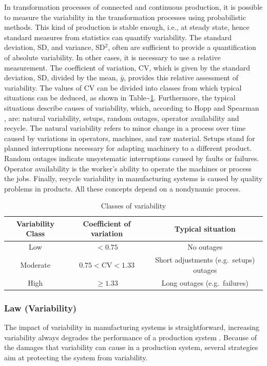 \documentclass{article}
\begin{document}
In transformation processes of connected and continuous production, it is possible to measure the variability in the transformation processes using probabilistic methods.
This kind of production is stable enough, i.e., at steady state, hence standard measures from statistics can quantify variability.
The standard deviation, SD, and variance, SD\(^2\), often are sufficient to provide a quantification of absolute variability.
In other cases, it is necessary to use a relative measurement.
The coefficient of variation, CV, which is given by the standard deviation, SD, divided by the mean, \(\bar{y}\), provides this relative assessment of variability.
The values of CV can be divided into classes from which typical situations can be deduced, as shown in Table\textasciitilde{}\ref{tb:Classes of variability}.
Furthermore, the typical situations describe causes of variability, which, according to Hopp and Spearman \cite{Hopp2001}, are: natural variability, setups, random outages, operator availability and recycle.
The natural variability refers to minor change in a process over time caused by variations in operators, machines, and raw material.
Setups stand for planned interruptions necessary for adapting machinery to a different product.
Random outages indicate unsystematic interruptions caused by faults or failures.
Operator availability is the worker's ability to operate the machines or process the jobs.
Finally, recycle variability in manufacturing systems is caused by quality problems in products.
All these concepts depend on a nondynamic process.

\begin{table}
\centering
\caption{Classes of variability}\label{tb:Classes of variability}
\begin{tabular}{ccc}
Variability Class & Coefficient of variation & Typical situation \\ \hline
Low & $< 0.75$ & No outages \\
Moderate & $0.75<$CV$<1.33$ & Short adjustments (e.g.\ setups) outages \\
High & $\geq 1.33$ & Long outages (e.g.\ failures)
\end{tabular}
\end{table}

\subsubsection{Law (Variability)}
\label{sec:org38db978}

The impact of variability in manufacturing systems is straightforward, increasing variability always degrades the performance of a production system \citep[p.295]{Hopp2001}.
Because of the damages that variability can cause in a production system, several strategies aim at protecting the system from variability.
\end{document}
